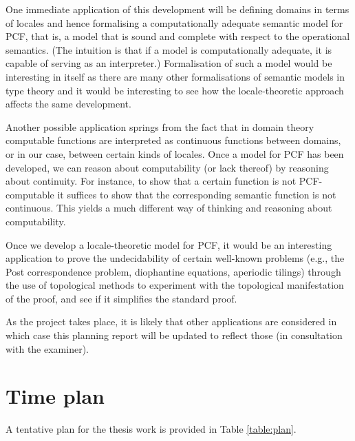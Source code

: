 \documentclass{article}
\begin{document}
One immediate application of this development will be defining domains in terms of locales
and hence formalising a computationally adequate semantic model for PCF, that is, a model
that is sound and complete with respect to the operational semantics. (The intuition is
that if a model is computationally adequate, it is capable of serving as an interpreter.)
Formalisation of such a model would be interesting in itself as there are many other
formalisations of semantic models in type theory and it would be interesting to see how
the locale-theoretic approach affects the same development.

Another possible application springs from the fact that in domain theory computable
functions are interpreted as continuous functions between domains, or in our case, between
certain kinds of locales. Once a model for PCF has been developed, we can reason about
computability (or lack thereof) by reasoning about continuity. For instance, to show that
a certain function is not PCF-computable it suffices to show that the corresponding
semantic function is not continuous. This yields a much different way of thinking and
reasoning about computability.

Once we develop a locale-theoretic model for PCF, it would be an interesting application
to prove the undecidability of certain well-known problems (e.g., the Post correspondence
problem, diophantine equations, aperiodic tilings) through the use of topological methods
to experiment with the topological manifestation of the proof, and see if it simplifies
the standard proof.

As the project takes place, it is likely that other applications are considered in which
case this planning report will be updated to reflect those (in consultation with the
examiner).

\section{Time plan}

A tentative plan for the thesis work is provided in Table \ref{table:plan}.
\end{document}
